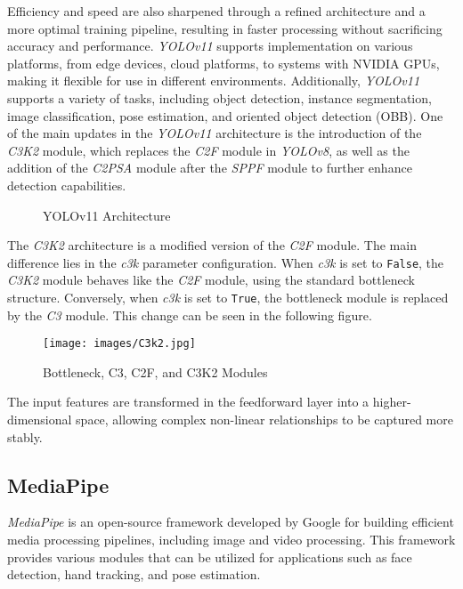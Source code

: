 Efficiency and speed are also sharpened through a refined architecture and a more optimal training pipeline, resulting in faster processing without sacrificing accuracy and performance. \emph{YOLOv11} supports implementation on various platforms, from edge devices, cloud platforms, to systems with NVIDIA GPUs, making it flexible for use in different environments. Additionally, \emph{YOLOv11} supports a variety of tasks, including object detection, instance segmentation, image classification, pose estimation, and oriented object detection (OBB). One of the main updates in the \emph{YOLOv11} architecture is the introduction of the \emph{C3K2} module, which replaces the \emph{C2F} module in \emph{YOLOv8}, as well as the addition of the \emph{C2PSA} module after the \emph{SPPF} module to further enhance detection capabilities.

\begin{figure}[H]
  \centering
  \resizebox{1\linewidth}{!}{
    
  }
  \caption{YOLOv11 Architecture}
  \label{fig:YOLOv11Architecture}
\end{figure}

The \emph{C3K2} architecture is a modified version of the \emph{C2F} module. The main difference lies in the \emph{c3k} parameter configuration. When \emph{c3k} is set to \texttt{False}, the \emph{C3K2} module behaves like the \emph{C2F} module, using the standard bottleneck structure. Conversely, when \emph{c3k} is set to \texttt{True}, the bottleneck module is replaced by the \emph{C3} module. This change can be seen in the following figure.

\begin{figure}[H]
  \centering
  \texttt{[image: images/C3k2.jpg]}
  \caption{Bottleneck, C3, C2F, and C3K2 Modules}
  \label{fig:c3k2}
\end{figure}

The input features are transformed in the feedforward layer into a higher-dimensional space, allowing complex non-linear relationships to be captured more stably.

\subsection{MediaPipe}
\label{subsec:MediaPipe}

\emph{MediaPipe} is an open-source framework developed by Google for building efficient media processing pipelines, including image and video processing. This framework provides various modules that can be utilized for applications such as face detection, hand tracking, and pose estimation.

